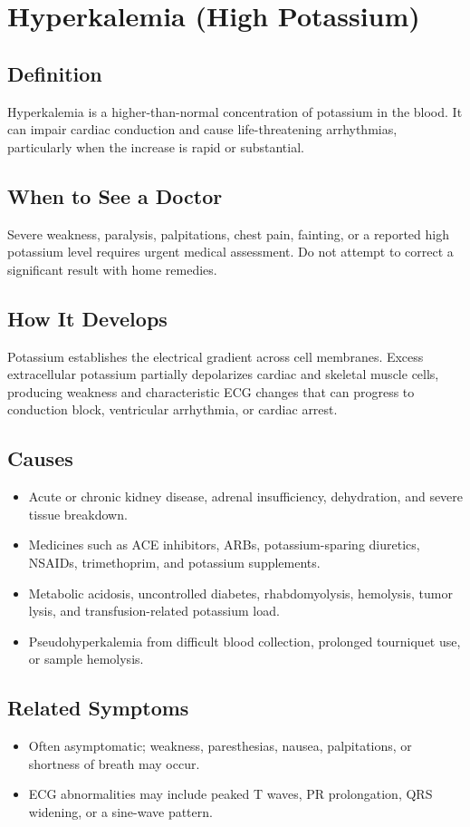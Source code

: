 \chapter{Hyperkalemia (High Potassium)}

\section*{Definition}
Hyperkalemia is a higher-than-normal concentration of potassium in the blood. It can impair cardiac conduction and cause life-threatening arrhythmias, particularly when the increase is rapid or substantial.

\section*{When to See a Doctor}
Severe weakness, paralysis, palpitations, chest pain, fainting, or a reported high potassium level requires urgent medical assessment. Do not attempt to correct a significant result with home remedies.

\section*{How It Develops}
Potassium establishes the electrical gradient across cell membranes. Excess extracellular potassium partially depolarizes cardiac and skeletal muscle cells, producing weakness and characteristic ECG changes that can progress to conduction block, ventricular arrhythmia, or cardiac arrest.

\section*{Causes}
\begin{itemize}
  \item Acute or chronic kidney disease, adrenal insufficiency, dehydration, and severe tissue breakdown.
  \item Medicines such as ACE inhibitors, ARBs, potassium-sparing diuretics, NSAIDs, trimethoprim, and potassium supplements.
  \item Metabolic acidosis, uncontrolled diabetes, rhabdomyolysis, hemolysis, tumor lysis, and transfusion-related potassium load.
  \item Pseudohyperkalemia from difficult blood collection, prolonged tourniquet use, or sample hemolysis.
\end{itemize}

\section*{Related Symptoms}
\begin{itemize}
  \item Often asymptomatic; weakness, paresthesias, nausea, palpitations, or shortness of breath may occur.
  \item ECG abnormalities may include peaked T waves, PR prolongation, QRS widening, or a sine-wave pattern.
\end{itemize}

